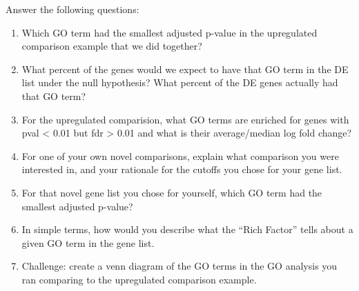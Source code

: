 \documentclass[
]{book}
\newenvironment{Shaded}{\begin{snugshade}}{\end{snugshade}}
\newcommand{\AttributeTok}[1]{\textcolor[rgb]{0.13,0.29,0.53}{#1}}
\newcommand{\CommentTok}[1]{\textcolor[rgb]{0.56,0.35,0.01}{\textit{#1}}}
\newcommand{\DecValTok}[1]{\textcolor[rgb]{0.00,0.00,0.81}{#1}}
\newcommand{\FunctionTok}[1]{\textcolor[rgb]{0.13,0.29,0.53}{\textbf{#1}}}
\newcommand{\NormalTok}[1]{#1}
\newcommand{\OtherTok}[1]{\textcolor[rgb]{0.56,0.35,0.01}{#1}}
\newcommand{\SpecialCharTok}[1]{\textcolor[rgb]{0.81,0.36,0.00}{\textbf{#1}}}
\newcommand{\StringTok}[1]{\textcolor[rgb]{0.31,0.60,0.02}{#1}}
\begin{document}
Answer the following questions:

\begin{enumerate}
\def\labelenumi{\arabic{enumi}.}
\item
  Which GO term had the smallest adjusted p-value in the upregulated comparison example that we did together?
\item
  What percent of the genes would we expect to have that GO term in the DE list under the null hypothesis? What percent of the DE genes actually had that GO term?
\item
  For the upregulated comparision, what GO terms are enriched for genes with pval \textless{} 0.01 but fdr \textgreater{} 0.01 and what is their average/median log fold change?
\item
  For one of your own novel comparisons, explain what comparison you were interested in, and your rationale for the cutoffs you chose for your gene list.
\item
  For that novel gene list you chose for yourself, which GO term had the smallest adjusted p-value?
\item
  In simple terms, how would you describe what the ``Rich Factor'' tells about a given GO term in the gene list.
\item
  Challenge: create a venn diagram of the GO terms in the GO analysis you ran comparing to the upregulated comparison example.
\end{enumerate}

\begin{Shaded}
\end{Shaded}
\end{document}
